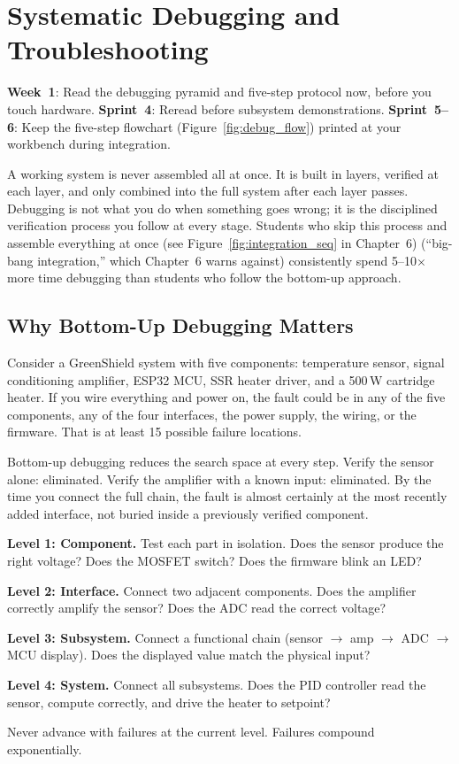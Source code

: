 \chapter{Systematic Debugging and Troubleshooting}\label{ch:debug}

\begin{tipbox}
\textbf{Week~1}: Read the debugging pyramid and five-step protocol now, before you touch hardware. \textbf{Sprint~4}: Reread before subsystem demonstrations. \textbf{Sprint~5--6}: Keep the five-step flowchart (Figure~\ref{fig:debug_flow}) printed at your workbench during integration.
\end{tipbox}

A working system is never assembled all at once. It is built in layers, verified at each layer, and only combined into the full system after each layer passes. Debugging is not what you do when something goes wrong; it is the disciplined verification process you follow at every stage. Students who skip this process and assemble everything at once (see Figure~\ref{fig:integration_seq} in Chapter~6) (``big-bang integration,'' which Chapter~6 warns against) consistently spend 5--10$\times$ more time debugging than students who follow the bottom-up approach.

\section{Why Bottom-Up Debugging Matters}
Consider a GreenShield system with five components: temperature sensor, signal conditioning amplifier, ESP32 MCU, SSR heater driver, and a 500\,W cartridge heater. If you wire everything and power on, the fault could be in any of the five components, any of the four interfaces, the power supply, the wiring, or the firmware. That is at least 15 possible failure locations.

Bottom-up debugging reduces the search space at every step. Verify the sensor alone: eliminated. Verify the amplifier with a known input: eliminated. By the time you connect the full chain, the fault is almost certainly at the most recently added interface, not buried inside a previously verified component.

\begin{keyconceptbox}
\textbf{Level 1: Component.} Test each part in isolation. Does the sensor produce the right voltage? Does the MOSFET switch? Does the firmware blink an LED?

\textbf{Level 2: Interface.} Connect two adjacent components. Does the amplifier correctly amplify the sensor? Does the ADC read the correct voltage?

\textbf{Level 3: Subsystem.} Connect a functional chain (sensor $\to$ amp $\to$ ADC $\to$ MCU display). Does the displayed value match the physical input?

\textbf{Level 4: System.} Connect all subsystems. Does the PID controller read the sensor, compute correctly, and drive the heater to setpoint?

Never advance with failures at the current level. Failures compound exponentially.
\end{keyconceptbox}

